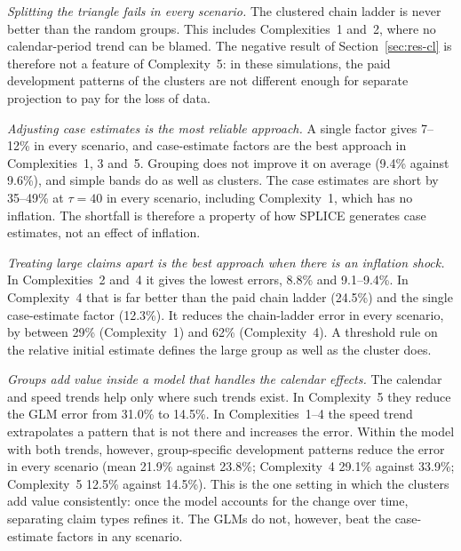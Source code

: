 \emph{Splitting the triangle fails in every scenario.} The clustered chain ladder is never better than the random groups. This includes Complexities~1 and~2, where no calendar-period trend can be blamed. The negative result of Section~\ref{sec:res-cl} is therefore not a feature of Complexity~5: in these simulations, the paid development patterns of the clusters are not different enough for separate projection to pay for the loss of data.

\emph{Adjusting case estimates is the most reliable approach.} A single factor gives 7--12\% in every scenario, and case-estimate factors are the best approach in Complexities~1, 3 and~5. Grouping does not improve it on average (9.4\% against 9.6\%), and simple bands do as well as clusters. The case estimates are short by 35--49\% at $\tau=40$ in every scenario, including Complexity~1, which has no inflation. The shortfall is therefore a property of how SPLICE generates case estimates, not an effect of inflation.

\emph{Treating large claims apart is the best approach when there is an inflation shock.} In Complexities~2 and~4 it gives the lowest errors, 8.8\% and 9.1--9.4\%. In Complexity~4 that is far better than the paid chain ladder (24.5\%) and the single case-estimate factor (12.3\%). It reduces the chain-ladder error in every scenario, by between 29\% (Complexity~1) and 62\% (Complexity~4). A threshold rule on the relative initial estimate defines the large group as well as the cluster does.

\emph{Groups add value inside a model that handles the calendar effects.} The calendar and speed trends help only where such trends exist. In Complexity~5 they reduce the GLM error from 31.0\% to 14.5\%. In Complexities~1--4 the speed trend extrapolates a pattern that is not there and increases the error. Within the model with both trends, however, group-specific development patterns reduce the error in every scenario (mean 21.9\% against 23.8\%; Complexity~4 29.1\% against 33.9\%; Complexity~5 12.5\% against 14.5\%). This is the one setting in which the clusters add value consistently: once the model accounts for the change over time, separating claim types refines it. The GLMs do not, however, beat the case-estimate factors in any scenario.

